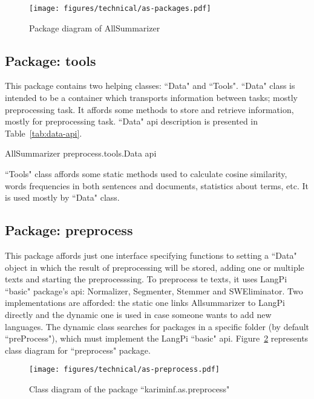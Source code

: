 \begin{figure}[!ht]
	\begin{center}
		\texttt{[image: figures/technical/as-packages.pdf]}
	\end{center}
	\caption{\label{fig:as-packages} Package diagram of AllSummarizer}
\end{figure}


\subsection{Package: tools}

This package contains two helping classes: ``Data" and ``Tools". 
``Data" class is intended to be a container which transports information between tasks; mostly preprocessing task.
It affords some methods to store and retrieve information, mostly for preprocessing task.
``Data" \ac{api} description is presented in Table~\ref{tab:data-api}.
\begin{table}[!ht]
	\centering
	\caption{AllSummarizer preprocess.tools.Data \ac{api}}
	\label{tab:data-api}
\end{table}


``Tools" class affords some static methods used to calculate cosine similarity, words frequencies in both sentences and documents, statistics about terms, etc.
It is used mostly by ``Data" class.


\subsection{Package: preprocess}

This package affords just one interface specifying functions to setting a ``Data" object in which the result of preprocessing will be stored, adding one or multiple texts and starting the preprocesssing.
To preprocess te texts, it uses LangPi ``basic" package's \ac{api}: Normalizer, Segmenter, Stemmer and SWEliminator.
Two implementations are afforded: the static one links Allsummarizer to LangPi directly and the dynamic one is used in case someone wants to add new languages. 
The dynamic class searches for packages in a specific folder (by default ``preProcess"), which must implement the LangPi ``basic" \ac{api}.
Figure~\ref{fig:as-preprocess} represents class diagram for ``preprocess" package.

\begin{figure}[!ht]
	\begin{center}
		\texttt{[image: figures/technical/as-preprocess.pdf]}
	\end{center}
	\caption{\label{fig:as-preprocess} Class diagram of the package ``kariminf.as.preprocess"}
\end{figure}


